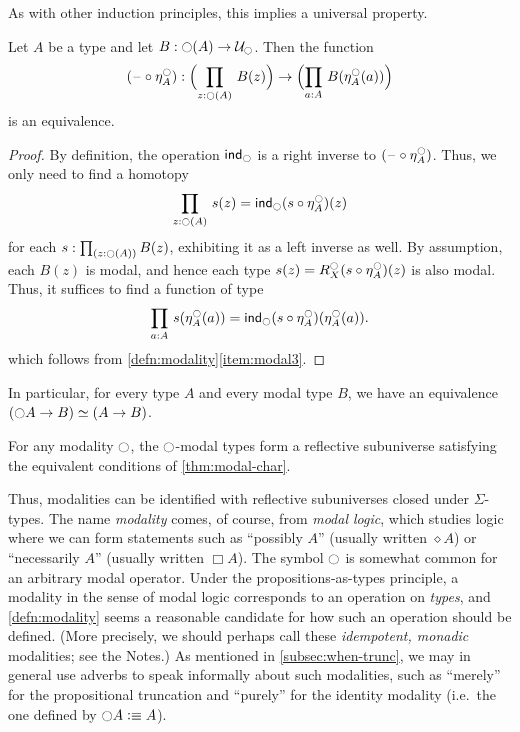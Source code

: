 %
As with other induction principles, this implies a universal property.

\begin{thm}\label{prop:lv_n_deptype_sec_equiv_by_precomp}
Let $A$ be a type and let $B:\ocircle(A)\to\mathcal{U}_{\ocircle}$. Then the function
\begin{equation*}
(\blank\circ \mreturn^\modal_A) : \Parens{\prd{z:\modal(A)}B(z)} \to \Parens{\prd{a:A}B(\mreturn^\modal_A(a))}
\end{equation*}
is an equivalence.
\end{thm}
\begin{proof}
By definition, the operation $\mathsf{ind}_{\ocircle}$ is a right inverse to $(\mathord{\hspace{1pt}\text{--}\hspace{1pt}}\circ \eta^{\ocircle}_A)$.
Thus, we only need to find a homotopy
\begin{equation*}
\prd{z:\modal(A)}s(z)= \ind{\modal}(s\circ \mreturn^\modal_A)(z)
\end{equation*}
for each $s:\prd{z:\modal(A)}B(z)$, exhibiting it as a left inverse as well.
By assumption, each $B(z)$ is modal, and hence each type $s(z)= R^{\ocircle}_X(s\circ \eta^{\ocircle}_A)(z)$
is also modal.
Thus, it suffices to find a function of type
\begin{equation*}
\prd{a:A}s(\mreturn^\modal_A(a))= \ind{\modal}(s\circ \mreturn^\modal_A)(\mreturn^\modal_A(a)).
\end{equation*}
which follows from \cref{defn:modality}\ref{item:modal3}.
\end{proof}

In particular, for every type $A$ and every modal type $B$, we have an equivalence $(\ocircle A\to B)\simeq (A\to B)$.

\begin{cor}
  For any modality $\ocircle$, the $\ocircle$-modal types form a reflective subuniverse satisfying the equivalent conditions of \cref{thm:modal-char}.
\end{cor}

Thus, modalities can be identified with reflective subuniverses closed under $\Sigma$-types.
The name \emph{modality} comes, of course, from \emph{modal logic}, which studies logic where we can form statements such as ``possibly $A$'' (usually written $\diamond A$) or ``necessarily $A$'' (usually written $\Box A$).
The symbol $\ocircle$ is somewhat common for an arbitrary modal operator. %
Under the propositions-as-types principle, a modality in the sense of modal logic corresponds to an operation on \emph{types}, and \cref{defn:modality} seems a reasonable candidate for how such an operation should be defined.
(More precisely, we should perhaps call these \emph{idempotent, monadic} modalities; see the Notes.)
%
As mentioned in \cref{subsec:when-trunc}, we may in general use adverbs to speak informally about such modalities, such as ``merely'' for the propositional truncation and ``purely'' for the identity modality
%
%
(i.e.\ the one defined by $\ocircle A \vcentcolon\equiv A$).

